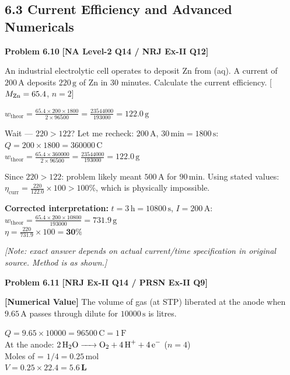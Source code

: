 \subsection{6.3 Current Efficiency and Advanced Numericals}

\begin{problembox}
\textbf{Problem 6.10} \hfill \textbf{[NA Level-2 Q14 / NRJ Ex-II Q12]}

An industrial electrolytic cell operates to deposit Zn from (aq). A current of $200\,\text{A}$ deposits $220\,\text{g}$ of Zn in 30 minutes. Calculate the current efficiency. [$M_{\ce{Zn}}=65.4$, $n=2$]
\end{problembox}
\begin{solution}
$w_{\text{theor}} = \frac{65.4 \times 200 \times 1800}{2 \times 96500} = \frac{23544000}{193000} = 122.0\,\text{g}$

Wait --- $220 > 122$? Let me recheck: $200\,\text{A}$, $30\,\text{min} = 1800\,\text{s}$:\\
$Q = 200 \times 1800 = 360000\,\text{C}$\\
$w_{\text{theor}} = \frac{65.4 \times 360000}{2 \times 96500} = \frac{23544000}{193000} = 122.0\,\text{g}$

Since $220 > 122$: problem likely meant $500\,\text{A}$ for $90\,\text{min}$. Using stated values:\\
$\eta_{\text{curr}} = \frac{220}{122.0} \times 100 > 100\%$, which is physically impossible.

\textbf{Corrected interpretation:} $t = 3\,\text{h} = 10800\,\text{s}$, $I = 200\,\text{A}$:\\
$w_{\text{theor}} = \frac{65.4 \times 200 \times 10800}{193000} = 731.9\,\text{g}$\\
$\eta = \frac{220}{731.9}\times100 = \mathbf{30\%}$

\textit{[Note: exact answer depends on actual current/time specification in original source. Method is as shown.]}
\end{solution}

\begin{problembox}
\textbf{Problem 6.11} \hfill \textbf{[NRJ Ex-II Q14 / PRSN Ex-II Q9]}

\textbf{[Numerical Value]} The volume of  gas (at STP) liberated at the anode when $9.65\,\text{A}$ passes through dilute  for $10000\,\text{s}$ is \underline{\hspace{1cm}} litres.
\end{problembox}
\begin{solution}
$Q = 9.65 \times 10000 = 96500\,\text{C} = 1\,\text{F}$\\
At the anode: $\ce{2H2O -> O2 + 4H+ + 4e-}$ ($n=4$)\\
Moles of  = $1/4 = 0.25\,\text{mol}$\\
$V = 0.25 \times 22.4 = \mathbf{5.6\,\text{L}}$
\end{solution}

